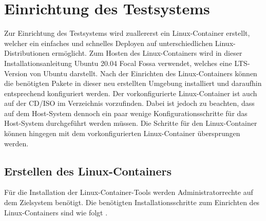 \section{Einrichtung des Testsystems}\label{appendix1:Einrichtung_des_Testsystems}
Zur Einrichtung des Testsystems wird zuallererst ein Linux-Container erstellt, welcher ein einfaches und schnelles Deployen auf unterschiedlichen Linux-Distributionen ermöglicht. Zum Hosten des Linux-Containers wird in dieser Installationsanleitung Ubuntu 20.04 Focal Fossa verwendet, welches eine LTS-Version von Ubuntu darstellt. Nach der Einrichten des Linux-Containers können die benötigten Pakete in dieser neu erstellten Umgebung installiert und daraufhin entsprechend konfiguriert werden. Der vorkonfigurierte Linux-Container ist auch auf der CD/ISO im Verzeichnis  vorzufinden. Dabei ist jedoch zu beachten, dass auf dem Host-System dennoch ein paar wenige Konfigurationsschritte für das Host-System durchgeführt werden müssen. Die Schritte für den Linux-Container können hingegen mit dem vorkonfigurierten Linux-Container übersprungen werden.

\subsection{Erstellen des Linux-Containers}
Für die Installation der Linux-Container-Tools werden Administratorrechte auf dem Zielsystem benötigt. Die benötigten Installationsschritte zum Einrichten des Linux-Containers sind wie folgt \cite{lxd_blog_nodate}.

